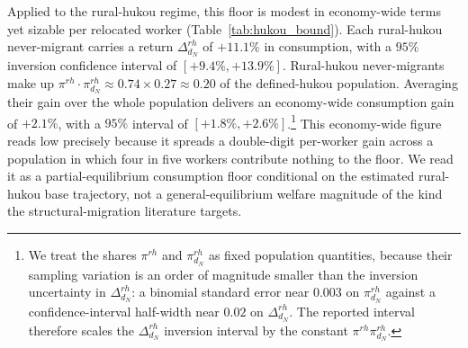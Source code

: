 \documentclass[12pt]{article}
\begin{document}
Applied to the rural-hukou regime, this floor is modest in economy-wide terms yet sizable per relocated worker (Table~\ref{tab:hukou_bound}).
Each rural-hukou never-migrant carries a return $\Delta_{d_N}^{rh}$ of $+11.1\%$ in consumption, with a $95\%$ inversion confidence interval of $[+9.4\%, +13.9\%]$.
Rural-hukou never-migrants make up $\pi^{rh}\cdot\pi_{d_N}^{rh} \approx 0.74 \times 0.27 \approx 0.20$ of the defined-hukou population.
Averaging their gain over the whole population delivers an economy-wide consumption gain of $+2.1\%$, with a $95\%$ interval of $[+1.8\%, +2.6\%]$.\footnote{We treat the shares $\pi^{rh}$ and $\pi_{d_N}^{rh}$ as fixed population quantities, because their sampling variation is an order of magnitude smaller than the inversion uncertainty in $\Delta_{d_N}^{rh}$: a binomial standard error near $0.003$ on $\pi_{d_N}^{rh}$ against a confidence-interval half-width near $0.02$ on $\Delta_{d_N}^{rh}$. The reported interval therefore scales the $\Delta_{d_N}^{rh}$ inversion interval by the constant $\pi^{rh}\pi_{d_N}^{rh}$.}
This economy-wide figure reads low precisely because it spreads a double-digit per-worker gain across a population in which four in five workers contribute nothing to the floor.
We read it as a partial-equilibrium consumption floor conditional on the estimated rural-hukou base trajectory, not a general-equilibrium welfare magnitude of the kind the structural-migration literature targets.


\end{document}
